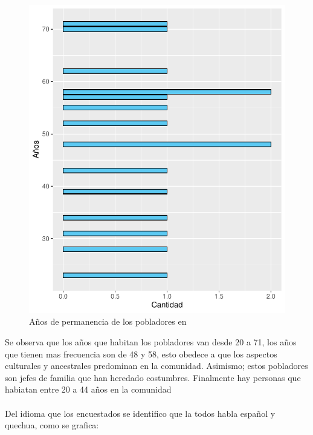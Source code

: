 \documentclass[12pt]{article}\usepackage[]{graphicx}\usepackage[]{xcolor}
\makeatletter
\def\maxwidth{ %
  \ifdim\Gin@nat@width>\linewidth
    \linewidth
  \else
    \Gin@nat@width
  \fi
}
\newenvironment{knitrout}{}{} %
\makeatother
\begin{document}
	\begin{figure}[H]
	\centering
\begin{knitrout}
\color{fgcolor}
\includegraphics[width=\maxwidth]{figure/cuatro-1} 
\end{knitrout}
	\caption{Años de permanencia de los pobladores en \comunidad}
	\end{figure}
	Se observa que los años que habitan los pobladores van desde 20 a 71, los años que tienen mas frecuencia son de 48 y 58, esto obedece a que los aspectos culturales y ancestrales predominan en la comunidad. Asimismo; estos pobladores son jefes de familia que han heredado costumbres. Finalmente hay personas que habiatan entre 20 a 44 años en la comunidad \\
	\\
	Del idioma que los encuestados se identifico que la todos habla español y quechua, como se grafica:
\end{document}
